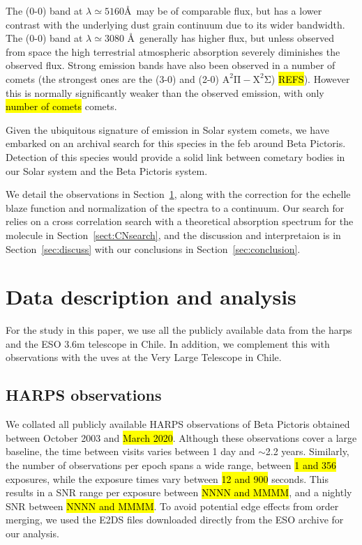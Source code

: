 \documentclass{aa}
\newcommand{\bp}{Beta Pictoris}
\begin{document}
The  (0-0) band at $\lambda\simeq 5160$\AA \ may be of comparable flux, but has a lower contrast with the underlying dust grain continuum due to its wider bandwidth.
%
The  (0-0) band at $\lambda\simeq 3080$ \AA \ generally has higher flux, but unless observed from space the high terrestrial atmospheric absorption severely diminishes the observed flux.
%
Strong  emission bands have also been observed in a number of comets (the strongest ones are the (3-0) and (2-0) $\mathrm{A^2\Pi-X^2\Sigma}$) \hl{REFS}).
%
However this is normally significantly weaker than the observed  emission, with only \hl{number of comets} comets.

Given the ubiquitous signature of  emission in Solar system comets, we have embarked on an archival search for this species in the \ac{feb} around \bp{}.
%
Detection of this species would provide a solid link between cometary bodies in our Solar system and the \bp{} system.

We detail the observations in Section~\ref{sec:data}, along with the correction for the echelle blaze function and normalization of the spectra to a continuum.
%
Our search for  relies on a cross correlation search with a theoretical absorption spectrum for the molecule in Section~\ref{sect:CNsearch}, and the discussion and interpretaion is in Section~\ref{sec:discuss} with our conclusions in Section~\ref{sec:conclusion}.

\section{Data description and analysis}\label{sec:data}

For the study in this paper, we use all the publicly available data from the \ac{harps} and the ESO 3.6m telescope in Chile.
%
In addition, we complement this with observations with the \ac{uves} at the Very Large Telescope in Chile. 

\subsection{HARPS observations}

We collated all publicly available HARPS observations of \bp{} obtained between October 2003 and \hl{March 2020}.
%
Although these observations cover a large baseline, the time between visits varies between 1 day and $\sim$2.2 years.
%
Similarly, the number of observations per epoch spans a wide range, between \hl{1 and 356} exposures, while the exposure times vary between \hl{12 and 900} seconds. This results in a SNR range per exposure between \hl{NNNN and MMMM}, and a nightly SNR between \hl{NNNN and MMMM}.
%
To avoid potential edge effects from order merging,  we used the E2DS files downloaded directly from the ESO archive for our analysis.
\end{document}
